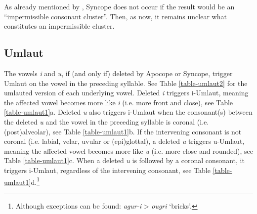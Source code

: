 As already mentioned by \textcites[156]{holiskygagua}, Syncope does not occur if the result would be an ``impermissible consonant cluster''. Then, as now, it remains unclear what constitutes an impermissible cluster.

\subsection{Umlaut}\label{subsec:umlaut}

The vowels \textit{i} and \textit{u}, if (and only if) deleted by Apocope or Syncope, trigger Umlaut on the vowel in the preceding syllable. See Table \ref{table-umlaut2} for the umlauted version of each underlying vowel. Deleted \textit{i} triggers i-Umlaut, meaning the affected vowel becomes more like \textit{i} (i.e. more front and close), see Table \ref{table-umlaut1}a. Deleted \textit{u} also triggers i-Umlaut when the consonant(s) between the deleted \textit{u} and the vowel in the preceding syllable is coronal (i.e. (post)alveolar), see Table \ref{table-umlaut1}b. If the intervening consonant is not coronal (i.e. labial, velar, uvular or (epi)glottal), a deleted \textit{u} triggers u-Umlaut, meaning the affected vowel becomes more like \textit{u} (i.e. more close and rounded), see Table \ref{table-umlaut1}c. When a deleted \textit{u} is followed by a coronal consonant, it triggers i-Umlaut, regardless of the intervening consonant, see Table \ref{table-umlaut1}d.\footnote{Although exceptions can be found: \textit{agur-i} > \textit{ougri} `bricks'.}

